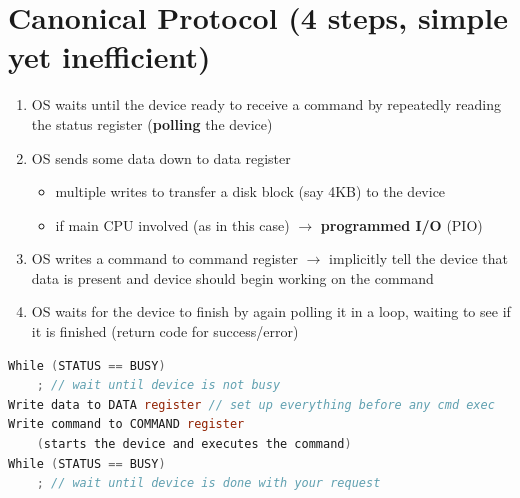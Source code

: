 \section*{Canonical Protocol (4 steps, simple yet inefficient)}
\begin{enumerate}
\item OS waits until the device ready to receive a command by repeatedly reading the status register (\textbf{polling} the device)
\item OS sends some data down to data register
  \begin{itemize}
  \item multiple writes to transfer a disk block (say 4KB) to the device
  \item if main CPU involved (as in this case) $\to$ \textbf{programmed I/O} (PIO)
  \end{itemize}
\item OS writes a command to command register $\to$ implicitly tell the device that data is present and device should begin working on the command
\item OS waits for the device to finish by again polling it in a loop, waiting to see if it is finished (return code for success/error)
\end{enumerate}
\begin{lstlisting}[language=c]
While (STATUS == BUSY)
    ; // wait until device is not busy
Write data to DATA register // set up everything before any cmd exec
Write command to COMMAND register
    (starts the device and executes the command)
While (STATUS == BUSY)
    ; // wait until device is done with your request
\end{lstlisting}
